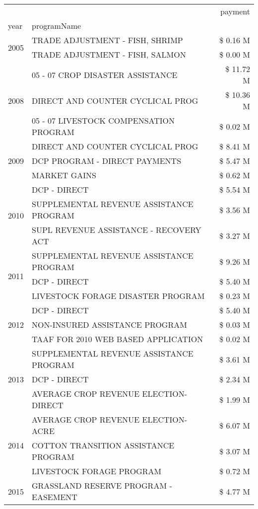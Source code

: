\begin{tabular}{llr}
\toprule
 &  & payment \\
year & programName &  \\
\midrule
\multirow[t]{2}{*}{2005} & TRADE ADJUSTMENT - FISH, SHRIMP & \$ 0.16 M \\
 & TRADE ADJUSTMENT - FISH, SALMON & \$ 0.00 M \\
\cline{1-3}
\multirow[t]{3}{*}{2008} & 05 - 07 CROP DISASTER ASSISTANCE & \$ 11.72 M \\
 & DIRECT AND COUNTER CYCLICAL PROG & \$ 10.36 M \\
 & 05 - 07 LIVESTOCK COMPENSATION PROGRAM & \$ 0.02 M \\
\cline{1-3}
\multirow[t]{3}{*}{2009} & DIRECT AND COUNTER CYCLICAL PROG & \$ 8.41 M \\
 & DCP PROGRAM - DIRECT PAYMENTS & \$ 5.47 M \\
 & MARKET GAINS & \$ 0.62 M \\
\cline{1-3}
\multirow[t]{3}{*}{2010} & DCP - DIRECT & \$ 5.54 M \\
 & SUPPLEMENTAL REVENUE ASSISTANCE PROGRAM & \$ 3.56 M \\
 & SUPL REVENUE ASSISTANCE - RECOVERY ACT & \$ 3.27 M \\
\cline{1-3}
\multirow[t]{3}{*}{2011} & SUPPLEMENTAL REVENUE ASSISTANCE PROGRAM & \$ 9.26 M \\
 & DCP - DIRECT & \$ 5.40 M \\
 & LIVESTOCK FORAGE DISASTER PROGRAM & \$ 0.23 M \\
\cline{1-3}
\multirow[t]{3}{*}{2012} & DCP - DIRECT & \$ 5.40 M \\
 & NON-INSURED ASSISTANCE PROGRAM & \$ 0.03 M \\
 & TAAF FOR 2010 WEB BASED APPLICATION & \$ 0.02 M \\
\cline{1-3}
\multirow[t]{3}{*}{2013} & SUPPLEMENTAL REVENUE ASSISTANCE PROGRAM & \$ 3.61 M \\
 & DCP - DIRECT & \$ 2.34 M \\
 & AVERAGE CROP REVENUE ELECTION-DIRECT & \$ 1.99 M \\
\cline{1-3}
\multirow[t]{3}{*}{2014} & AVERAGE CROP REVENUE ELECTION-ACRE & \$ 6.07 M \\
 & COTTON TRANSITION ASSISTANCE PROGRAM & \$ 3.07 M \\
 & LIVESTOCK FORAGE PROGRAM & \$ 0.72 M \\
\cline{1-3}
\multirow[t]{3}{*}{2015} & GRASSLAND RESERVE PROGRAM - EASEMENT & \$ 4.77 M \\

\end{tabular}
